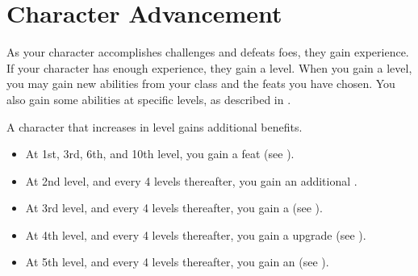\section{Character Advancement}\label{Character Advancement}

    As your character accomplishes challenges and defeats foes, they gain experience.
    If your character has enough experience, they gain a level.
    When you gain a level, you may gain new abilities from your class and the feats you have chosen.
    You also gain some abilities at specific levels, as described in .

    A character that increases in level gains additional benefits.
    \begin{itemize}
        \item At 1st, 3rd, 6th, and 10th level, you gain a feat (see ).
        \item At 2nd level, and every 4 levels thereafter, you gain an additional .
        \item At 3rd level, and every 4 levels thereafter, you gain a  (see ).
        \item At 4th level, and every 4 levels thereafter, you gain a  upgrade (see ).
        \item At 5th level, and every 4 levels thereafter, you gain an  (see ).
    \end{itemize}

